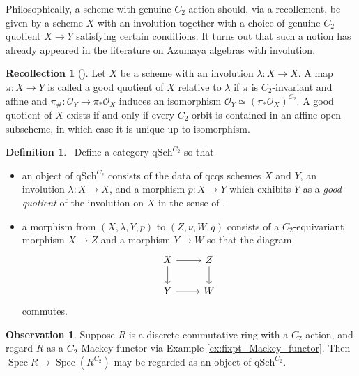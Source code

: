 \documentclass{article}
\DeclareMathOperator{\Spec}{Spec}
\theoremstyle{definition}
\newtheorem{definition}[equation]{Definition}
\newtheorem{observation}[equation]{Observation}
\newtheorem{recollection}[equation]{Recollection}
\begin{document}
Philosophically, a scheme with genuine $C_2$-action should, via a recollement, be given by a scheme $X$ with an involution together with a choice of genuine $C_2$ quotient $X\to Y$ satisfying certain conditions. It turns out that such a notion has already appeared in the literature on Azumaya algebras with involution.

\begin{recollection} [{\cite[Remark 4.20]{azumaya_involution}}]
    Let $ X $ be a scheme with an involution $ \lambda \colon X \to X $. 
    A map $ \pi \colon X \to Y $ is called a good quotient of $ X $ relative to $ \lambda $ if $ \pi $ is $ C_2 $-invariant and affine and $ \pi_{\#} \colon \mathcal{O}_Y \to \pi_{*} \mathcal{O}_X $ induces an isomorphism $ \mathcal{O}_Y \simeq \left(\pi_{*} \mathcal{O}_X\right)^{C_2} $. 
    A good quotient of $ X $ exists if and only if every $ C_2 $-orbit is contained in an affine open subscheme, in which case it is unique up to isomorphism. 
\end{recollection}
\begin{definition}~\label{defn:Category of good quotients}
    Define a category $ \mathrm{qSch}^{C_2} $ so that
    \begin{itemize}
        \item an object of $ \mathrm{qSch}^{C_2} $ consists of the data of qcqs schemes $ X $ and $ Y $, an involution $ \lambda \colon X \to X $, and a morphism $ p \colon X \to Y $ which exhibits $ Y $ as a \emph{good quotient} of the involution on $ X $ in the sense of \cite[Remark 4.20]{azumaya_involution}. 
        \item a morphism from $ (X,\lambda, Y, p) $ to $ (Z,\nu, W, q) $ consists of a $ C_2 $-equivariant morphism $ X \to Z $ and a morphism $ Y \to W $ so that the diagram
        \begin{equation*}
        \begin{tikzcd}
            X \ar[d] \ar[r] & Z \ar[d] \\
            Y \ar[r] & W
        \end{tikzcd}
        \end{equation*}
        commutes. 
    \end{itemize}
\end{definition}
\begin{observation}\label{obs:fixpt_Mackey_functor_as_affine_C2_scheme}
    Suppose $ R $ is a discrete commutative ring with a $ C_2 $-action, and regard $ R $ as a $ C_2 $-Mackey functor via Example \ref{ex:fixpt_Mackey_functor}. 
    Then $ \Spec R \to \Spec (R^{C_2}) $ may be regarded as an object of $ \mathrm{qSch}^{C_2} $. 
\end{observation}
\end{document}
